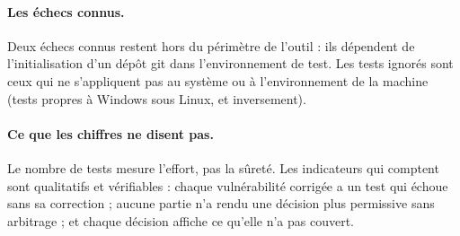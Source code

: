 \paragraph{Les échecs connus.} Deux échecs connus restent hors du périmètre de l'outil : ils
dépendent de l'initialisation d'un dépôt git dans l'environnement de test. Les tests ignorés
sont ceux qui ne s'appliquent pas au système ou à l'environnement de la machine (tests propres à
Windows sous Linux, et inversement).

\paragraph{Ce que les chiffres ne disent pas.} Le nombre de tests mesure l'effort, pas la
sûreté. Les indicateurs qui comptent sont qualitatifs et vérifiables : chaque vulnérabilité
corrigée a un test qui échoue sans sa correction ; aucune partie n'a rendu une décision plus
permissive sans arbitrage ; et chaque décision affiche ce qu'elle n'a pas couvert.

